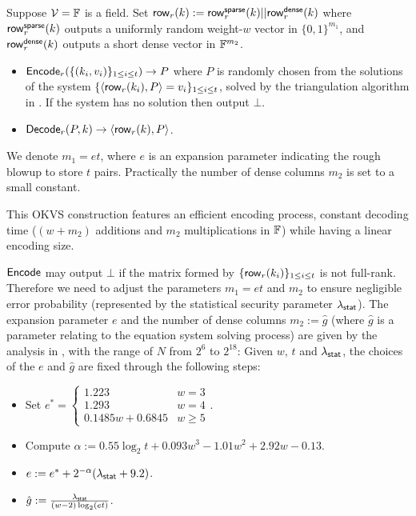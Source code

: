 \begin{construction}\label{con:OKVS_sparse_matrix}
    Suppose $\mathcal{V}=\mathbb{F}$ is a field. Set ${\sf row}_r(k):={\sf row}_r^{\sf sparse}(k)||{\sf row}_r^{\sf dense}(k)$ where ${\sf row}_r^{\sf sparse}(k)$ outputs a uniformly random weight-$w$ vector in $\{0,1\}^{m_1}$, and ${\sf row}_r^{\sf dense}(k)$ outputs a short dense vector in $\mathbb{F}^{m_2}$. 
    \begin{itemize}
      \item ${\sf Encode}_r(\{(k_i,v_i)\}_{1\le i\le t}) \rightarrow P$ where $P$ is randomly chosen from the solutions of the system $\{\langle {\sf row}_r(k_i), P \rangle = v_i\}_{1\le i\le t}$, solved by the triangulation algorithm in \cite{cryptoeprint:2022/320}. If the system has no solution then output $\bot$. 
      \item ${\sf Decode}_r(P,k)\rightarrow \langle {\sf row}_r(k), P \rangle$. 
    \end{itemize}
    We denote $m_1=et$, where $e$ is an expansion parameter indicating the rough blowup to store $t$ pairs. Practically the number of dense columns $m_2$ is set to a small constant. 
  \end{construction}
  This OKVS construction features an efficient encoding process, constant decoding time ($(w+m_2)$ additions and $m_2$ multiplications in $\mathbb{F}$) while having a linear encoding size. 
  
  ${\sf Encode}$ may output $\bot$ if the matrix formed by $\{{\sf row}_r(k_i)\}_{1\le i\le t}$ is not full-rank. Therefore we need to adjust the parameters $m_1=et$ and $m_2$ to ensure negligible error probability (represented by the statistical security parameter $\lambda_{\sf stat}$). The expansion parameter $e$ and the number of dense columns $m_2:=\hat{g}$ (where $\hat{g}$ is a parameter relating to the equation system solving process) are given by the analysis in \cite{cryptoeprint:2022/320}, with the range of $N$ from $2^6$ to $2^{18}$: Given $w$, $t$ and $\lambda_{\sf stat}$, the choices of the $e$ and $\hat{g}$ are fixed through the following steps: 
  \begin{itemize}
    \item Set $e^* = \begin{cases}
      1.223 & w=3\\
      1.293 & w=4\\
      0.1485w+0.6845 & w\ge 5
    \end{cases}$.
    \item Compute $\alpha:=0.55 \log_2 t + 0.093w^3-1.01w^2 + 2.92w-0.13$.
    \item $e:=e^*+ 2^{-\alpha}(\lambda_{\sf stat}+9.2)$. 
    \item $\hat{g}:=\frac{\lambda_{\sf stat}}{(w-2)\log_2(et)}$. 
  \end{itemize}
  
